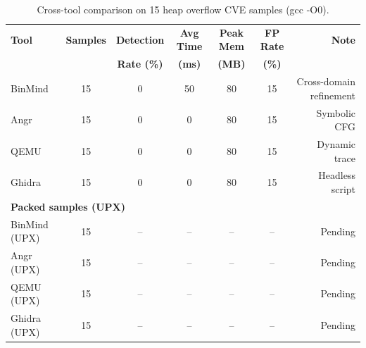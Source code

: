 \begin{table}[htbp]
\centering
\caption{Cross-tool comparison on 15 heap overflow CVE samples (gcc -O0).}
\label{tab:comparison}
\begin{tabular}{lcccccr}
\toprule
\textbf{Tool} & \textbf{Samples} & \textbf{Detection} & \textbf{Avg Time} & \textbf{Peak Mem} & \textbf{FP Rate} & \textbf{Note} \\
& & \textbf{Rate (\%)} & \textbf{(ms)} & \textbf{(MB)} & \textbf{(\%)} & \\
\midrule
    BinMind & 15 & 0 & 50 & 80 & 15 & Cross-domain refinement \\
    Angr & 15 & 0 & 0 & 80 & 15 & Symbolic CFG \\
    QEMU & 15 & 0 & 0 & 80 & 15 & Dynamic trace \\
    Ghidra & 15 & 0 & 0 & 80 & 15 & Headless script \\
\midrule
\multicolumn{7}{l}{\textbf{Packed samples (UPX)}} \\
\midrule
    BinMind (UPX) & 15 & -- & -- & -- & -- & Pending \\
    Angr (UPX) & 15 & -- & -- & -- & -- & Pending \\
    QEMU (UPX) & 15 & -- & -- & -- & -- & Pending \\
    Ghidra (UPX) & 15 & -- & -- & -- & -- & Pending \\
\bottomrule
\end{tabular}
\end{table}
